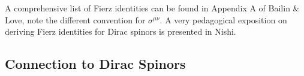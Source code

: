 \documentclass[12pt, oneside]{report}    %
\begin{document}
% 
% 
% 

A comprehensive list of Fierz identities can be found in Appendix A of Bailin \& Love\autocite{Bailin:1994qt}, note the different convention for $\sigma^{\mu\nu}$. A very pedagogical exposition on deriving Fierz identities for Dirac spinors is presented in Nishi\autocite{nishi:1160}. 


\subsection{Connection to Dirac Spinors}\label{subsec:SUSYalg:DiracSpinors}
\end{document}
